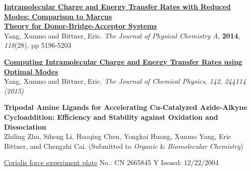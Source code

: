 \documentclass[12pt,letterpaper]{article}
\newcommand{\mhead}[1]{\leavevmode\marginpar{\sffamily\footnotesize #1}}
\begin{document}
\bigskip
\mhead{Publications}%
\href{http://pubs.acs.org/doi/abs/10.1021/jp503041y}{\textbf{Intramolecular Charge and Energy Transfer Rates with Reduced Modes: Comparison to Marcus}}\\
\href{http://pubs.acs.org/doi/abs/10.1021/jp503041y}{\textbf{Theory for Donor-Bridge-Acceptor Systems}}\\
Yang, Xunmo and Bittner, Eric. \emph{The Journal of Physical Chemistry A}, \textbf{2014}, \emph{118}(28), pp 5196-5203

\href{http://scitation.aip.org/content/aip/journal/jcp/142/24/10.1063/1.4923191}{\textbf{Computing Intramolecular Charge and Energy Transfer Rates using Optimal Modes}}\\
Yang, Xunmo and Bittner, Eric. \emph{The Journal of Chemical Physics, \emph{142}, 244114 (2015)}

\smallskip
\textbf{Tripodal Amine Ligands for Accelerating Cu-Catalyzed Azide-Alkyne Cycloaddition: Efficiency and Stability against Oxidation and Dissociation}\\
Zhiling Zhu, Siheng Li, Haoqing Chen, Yongkai Huang, Xunmo Yang, Eric Bittner, and Chengzhi Cai. (Submitted to \emph{Organic} \& \emph{Biomolecular Chemistry})


\bigskip
\mhead{Patent}%
\href{https://www.google.com/patents/CN2665845Y?cl=en}{Coriolis force experiment plate} \quad\quad\quad\quad No.: CN 2665845 Y  \quad\quad\quad\quad Issued: 12/22/2004


\end{document}
